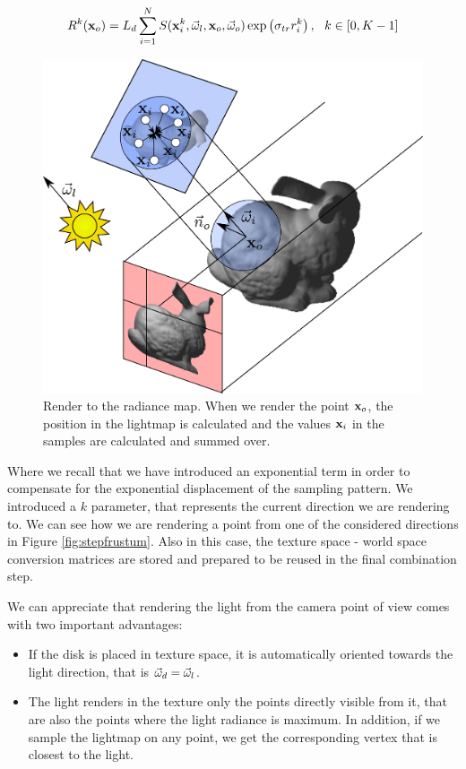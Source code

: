 $$
R^{k}(\mathbf{x}_o) = L_d \sum_{i = 1}^N S(\mathbf{x}^{k}_i, \vec{\omega}_l, \mathbf{x}_o, \vec{\omega}_o) \exp\left(\sigma_{tr} r^{k}_i\right), \ \ k \in [0,K-1] 
\label{eq:evolution_step}
$$

\begin{figure}[!ht]
\centering
\includegraphics[width=0.9 \linewidth]{images/method/step2_improved.pdf}
\caption{Render to the radiance map. When we render the point $\mathbf{x}_o$, the position in the lightmap is calculated and the values $\mathbf{x}_i$ in the samples are calculated and summed over.}
\label{fig:step2}
\end{figure} 

Where we recall that we have introduced an exponential term in order to compensate for the exponential displacement of the sampling pattern. We introduced a $k$ parameter, that represents the current direction we are rendering to. We can see how we are rendering a point from one of the considered directions in Figure \ref{fig:stepfrustum}. Also in this case, the texture space - world space conversion matrices are stored and prepared to be reused in the final combination step. 

We can appreciate that rendering the light from the camera point of view comes with two important advantages:

\begin{itemize}
	\item If the disk is placed in texture space, it is automatically oriented towards the light direction, that is $\vec{\omega}_d = \vec{\omega}_l$.
	\item The light renders in the texture only the points directly visible from it, that are also the points where the light radiance is maximum. In addition, if we sample the lightmap on any point, we get the corresponding vertex that is closest to the light.
\end{itemize}

